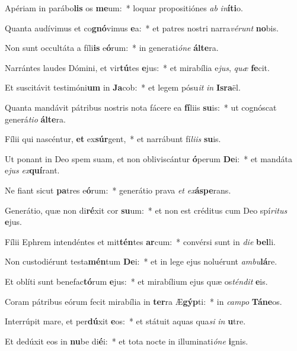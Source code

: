\item Apériam in parábo\textbf{lis} os \textbf{me}um:~* loquar propositiónes \textit{ab} \textit{in}\textbf{í}\textbf{ti}o.
\item Quanta audívimus et co\textbf{gnó}vimus \textbf{e}a:~* et patres nostri narra\textit{vé}\textit{runt} \textbf{no}bis.
\item Non sunt occultáta a fíli\textbf{is} e\textbf{ó}rum:~* in generati\textit{ó}\textit{ne} \textbf{ál}\textbf{te}ra.
\item Narrántes laudes Dómini, et vir\textbf{tú}tes \textbf{e}jus:~* et mirabília e\textit{jus}, \textit{quæ} \textbf{fe}cit.
\item Et suscitávit testimóni\textbf{um} in \textbf{Ja}cob:~* et legem pósu\textit{it} \textit{in} \textbf{Is}\textbf{ra}ël.
\item Quanta mandávit pátribus nostris nota fácere ea \textbf{fí}liis \textbf{su}is:~* ut cognóscat generá\textit{ti}\textit{o} \textbf{ál}\textbf{te}ra.
\item Fílii qui nascéntur, \textbf{et} ex\textbf{súr}gent,~* et narrábunt fí\textit{li}\textit{is} \textbf{su}is.
\item Ut ponant in Deo spem suam, et non obliviscántur \textbf{ó}perum \textbf{De}i:~* et mandáta e\textit{jus} \textit{ex}\textbf{quí}rant.
\item Ne fiant sicut \textbf{pa}tres e\textbf{ó}rum:~* generátio prava \textit{et} \textit{ex}\textbf{ás}\textbf{pe}rans.
\item Generátio, quæ non di\textbf{ré}xit cor \textbf{su}um:~* et non est créditus cum Deo spí\textit{ri}\textit{tus} \textbf{e}jus.
\item Fílii Ephrem intendéntes et mit\textbf{tén}tes \textbf{ar}cum:~* convérsi sunt in \textit{di}\textit{e} \textbf{bel}li.
\item Non custodiérunt testa\textbf{mén}tum \textbf{De}i:~* et in lege ejus noluérunt \textit{am}\textit{bu}\textbf{lá}re.
\item Et oblíti sunt benefac\textbf{tó}rum \textbf{e}jus:~* et mirabílium ejus quæ os\textit{tén}\textit{dit} \textbf{e}is.
\item Coram pátribus eórum fecit mirabília in \textbf{ter}ra Æ\textbf{gýp}ti:~* in \textit{cam}\textit{po} \textbf{Tá}\textbf{ne}os.
\item Interrúpit mare, et per\textbf{dú}xit \textbf{e}os:~* et státuit aquas qua\textit{si} \textit{in} \textbf{u}tre.
\item Et dedúxit eos in \textbf{nu}be di\textbf{é}i:~* et tota nocte in illuminati\textit{ó}\textit{ne} \textbf{i}gnis.
